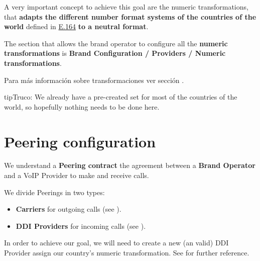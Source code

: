 \documentclass[letterpaper,10pt,spanish]{sphinxmanual}
\begin{document}
A very important concept to achieve this goal are the numeric transformations,
that \textbf{adapts the different number format systems of the countries of the world}
defined in \href{https://www.itu.int/rec/T-REC-E.164/es}{E.164} \textbf{to a neutral
format}.

The section that allows the brand operator to configure all the \textbf{numeric
transformations} is \textbf{Brand Configuration / Providers / Numeric transformations}.

Para más información sobre transformaciones ver sección {\hyperref[administration_portal/brand/settings/numeric_transformations:transformaciones\string-numericas]{}}.

\begin{notice}{tip}{Truco:}
We already have a pre-created set for most of the countries of the world, so hopefully nothing needs to be done here.
\end{notice}


\section{Peering configuration}
\label{getting_started/external_incoming_calls/peering:peering-configuration}\label{getting_started/external_incoming_calls/peering::doc}
We understand a \textbf{Peering contract} the agreement between a \textbf{Brand Operator}
and a VoIP Provider to make and receive calls.

We divide Peerings in two types:
\begin{itemize}
\item {} 
\textbf{Carriers} for outgoing calls (see {\hyperref[administration_portal/brand/providers/carriers:carriers]{}}).

\item {} 
\textbf{DDI Providers} for incoming calls (see {\hyperref[administration_portal/brand/providers/ddi_providers:ddi\string-providers]{}}).

\end{itemize}

In order to achieve our goal, we will need to create a new (an valid) DDI Provider assign our country's
numeric transformation. See {\hyperref[administration_portal/brand/providers/ddi_providers:ddi\string-providers]{}} for further reference.
\end{document}
